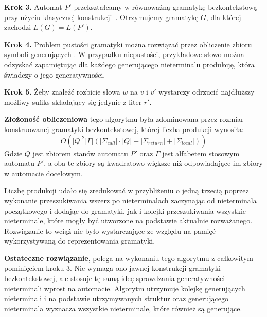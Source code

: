 \textbf{Krok 3.} Automat $P'$ przekształcamy w równoważną gramatykę bezkontekstową przy użyciu klasycznej konstrukcji~\cite[6.3.2 From PDA's to Grammars]{DPDAtoCFG}.
Otrzymujemy gramatykę $G$, dla której zachodzi $L(G) = L(P')$.

\textbf{Krok 4.} Problem pustości gramatyki można rozwiązać przez obliczenie zbioru symboli generujących
\cite[7.1.2 Computing the Generating and Reachable Symbols]{DPDAtoCFG}. W przypadku niepustości, przykładowe słowo można odzyskać zapamiętując
dla każdego generującego nieterminalu produkcję, która świadczy o jego generatywności.

\textbf{Krok 5.} Żeby znaleźć rozbicie słowa $w$ na $v$ i $v'$ wystarczy odrzucić najdłuższy możliwy sufiks składający się jedynie z liter $r'$.

\textbf{Złożoność obliczeniowa} tego algorytmu była zdominowana przez rozmiar konstruowanej gramatyki bezkontekstowej, której liczba produkcji
wynosiła:
$$O(|Q|^2|\Gamma|(|\Sigma_{call}| \cdot |Q| + |\Sigma_{return}| + |\Sigma_{local}|))$$
Gdzie $Q$ jest zbiorem stanów automatu $P'$ oraz $\Gamma$ jest alfabetem stosowym automatu $P'$,
a oba te zbiory są kwadratowo większe niż odpowiadające im zbiory w automacie docelowym.

Liczbę produkcji udało się zredukować w przybliżeniu o jedną trzecią poprzez wykonanie przeszukiwania wszerz po nieterminalach zaczynając
od nieterminala początkowego i dodając do gramatyki, jak i kolejki przeszukiwania wszystkie nieterminale, które mogły być utworzone na podstawie
aktualnie rozważanego. Rozwiązanie to wciąż nie było wystarczające ze względu na pamięć wykorzystywaną do reprezentowania gramatyki.

\textbf{Ostateczne rozwiązanie}, polega na wykonaniu tego algorytmu z całkowitym pominięciem kroku 3.
Nie wymaga ono jawnej konstrukcji gramatyki bezkontekstowej, ale stosuje tę samą ideę sprawdzania generatywności
nieterminali wprost na automacie. Algorytm utrzymuje kolejkę generujących nieterminali i na podstawie utrzymywanych
struktur oraz generującego nieterminala wyznacza wszystkie nieterminale, które również są generujące.